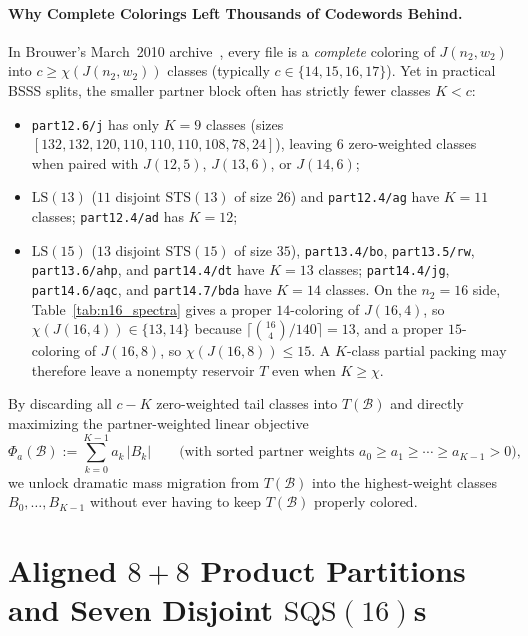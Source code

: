 \documentclass[11pt,letterpaper]{article}
\theoremstyle{plain}
\theoremstyle{definition}
\theoremstyle{remark}
\begin{document}
\paragraph{Why Complete Colorings Left Thousands of Codewords Behind.}
In Brouwer's March~2010 archive~\cite{BrouwerPartitions2010}, every file is a \emph{complete} coloring of $J(n_2, w_2)$ into $c \ge \chi(J(n_2, w_2))$ classes (typically $c \in \{14, 15, 16, 17\}$). Yet in practical BSSS splits, the smaller partner block often has strictly fewer classes $K < c$:
\begin{itemize}[leftmargin=1.5em,itemsep=1pt]
    \item \texttt{part12.6/j} has only $K = 9$ classes (sizes $[132, 132, 120, 110, 110, 110, 108, 78, 24]$), leaving $6$ zero-weighted classes when paired with $J(12, 5)$, $J(13, 6)$, or $J(14, 6)$;
    \item $\mathrm{LS}(13)$ ($11$ disjoint $\mathrm{STS}(13)$ of size $26$) and \texttt{part12.4/ag} have $K = 11$ classes; \texttt{part12.4/ad} has $K = 12$;
    \item $\mathrm{LS}(15)$ ($13$ disjoint $\mathrm{STS}(15)$ of size $35$), \texttt{part13.4/\allowbreak bo}, \texttt{part13.5/\allowbreak rw}, \texttt{part13.6/\allowbreak ahp}, and \texttt{part14.4/\allowbreak dt} have $K = 13$ classes; \texttt{part14.4/\allowbreak jg}, \texttt{part14.6/\allowbreak aqc}, and \texttt{part14.7/\allowbreak bda} have $K = 14$ classes. On the $n_2 = 16$ side, Table~\ref{tab:n16_spectra} gives a proper $14$-coloring of $J(16, 4)$, so $\chi(J(16, 4)) \in \{13, 14\}$ because $\lceil \binom{16}{4}/140 \rceil = 13$, and a proper $15$-coloring of $J(16, 8)$, so $\chi(J(16, 8)) \le 15$. A $K$-class partial packing may therefore leave a nonempty reservoir $T$ even when $K \ge \chi$.
\end{itemize}
By discarding all $c - K$ zero-weighted tail classes into $T(\mathcal{B})$ and directly maximizing the partner-weighted linear objective
\begin{equation}
\label{eq:obj}
\Phi_a(\mathcal{B}) := \sum_{k=0}^{K-1} a_k\, |B_k| \qquad \text{(with sorted partner weights } a_0 \ge a_1 \ge \cdots \ge a_{K-1} > 0\text{)},
\end{equation}
we unlock dramatic mass migration from $T(\mathcal{B})$ into the highest-weight classes $B_0, \dots, B_{K-1}$ without ever having to keep $T(\mathcal{B})$ properly colored.

\section{Aligned \texorpdfstring{$8{+}8$}{8+8} Product Partitions and Seven Disjoint \texorpdfstring{$\mathrm{SQS}(16)$}{SQS(16)}s}
\label{sec:n16}
\end{document}
